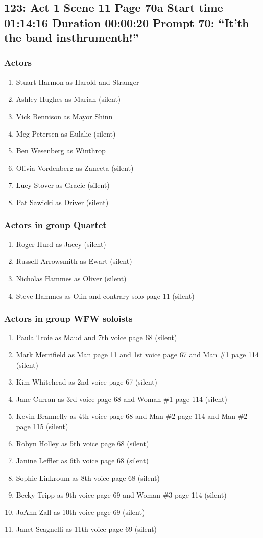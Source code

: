 \subsection{123: Act 1 Scene 11 Page 70a Start time 01:14:16 Duration 00:00:20 Prompt 70: ``It'th the band insthrumenth!''}

\subsubsection{Actors}
\begin{enumerate}
\item Stuart Harmon as Harold and Stranger
\item Ashley Hughes as Marian (silent)
\item Vick Bennison as Mayor Shinn
\item Meg Petersen as Eulalie (silent)
\item Ben Wesenberg as Winthrop
\item Olivia Vordenberg as Zaneeta (silent)
\item Lucy Stover as Gracie (silent)
\item Pat Sawicki as Driver (silent)
\end{enumerate}
\subsubsection{Actors in group Quartet}
\begin{enumerate}
\item Roger Hurd as Jacey (silent)
\item Russell Arrowsmith as Ewart (silent)
\item Nicholas Hammes as Oliver (silent)
\item Steve Hammes as Olin and contrary solo page 11 (silent)
\end{enumerate}
\subsubsection{Actors in group WFW soloists}
\begin{enumerate}
\item Paula Troie as Maud and 7th voice page 68 (silent)
\item Mark Merrifield as Man page 11 and 1st voice page 67 and Man \#1 page 114 (silent)
\item Kim Whitehead as 2nd voice page 67 (silent)
\item Jane Curran as 3rd voice page 68 and Woman \#1 page 114 (silent)
\item Kevin Brannelly as 4th voice page 68 and Man \#2 page 114 and Man \#2 page 115 (silent)
\item Robyn Holley as 5th voice page 68 (silent)
\item Janine Leffler as 6th voice page 68 (silent)
\item Sophie Linkroum as 8th voice page 68 (silent)
\item Becky Tripp as 9th voice page 69 and Woman \#3 page 114 (silent)
\item JoAnn Zall as 10th voice page 69 (silent)
\item Janet Scagnelli as 11th voice page 69 (silent)
\end{enumerate}

